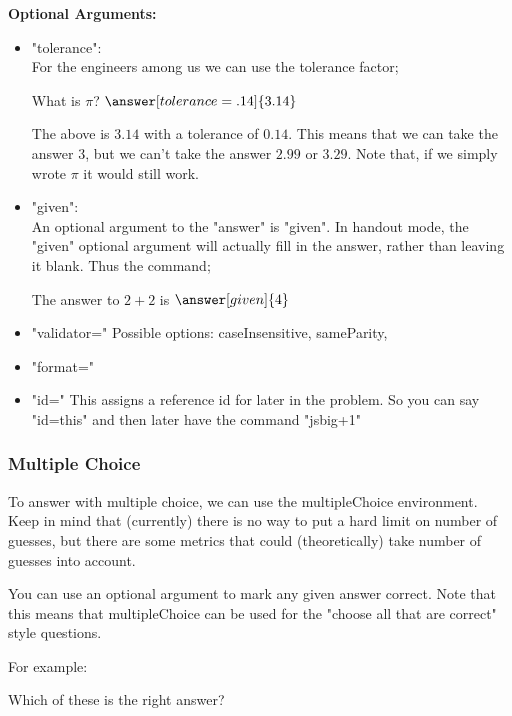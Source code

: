 \documentclass{ximera}
\begin{document}
\textbf{Optional Arguments:}

\begin{itemize}
\item "tolerance":\\
For the engineers among us we can use the tolerance factor;
\begin{problem}
What is $\pi$?
$\answer[tolerance=.14]{3.14}$
\end{problem}
The above is $3.14$ with a tolerance of $0.14$. This means that we can take the answer 3, but we can't take the answer $2.99$ or $3.29$. Note that, if we simply wrote $\pi$ it would still work.


\item "given":\\
An optional argument to the "answer" is "given". In handout mode, the "given" optional argument will actually fill in the answer, rather than leaving it blank. Thus the command;

\begin{question}
The answer to $2 + 2$ is $\answer[given]{4}$
\end{question}

\item "validator="
Possible options: caseInsensitive, sameParity, 

\item "format="

\item "id="
This assigns a reference id for later in the problem. So you can say "id=this" and then later have the command "js{big+1}"



\end{itemize}

\subsubsection{Multiple Choice}
To answer with multiple choice, we can use the multipleChoice environment. Keep in mind that (currently) there is no way to put a hard limit on number of guesses, but there are some metrics that could (theoretically) take number of guesses into account. 

You can use an optional argument to mark any given answer correct. Note that this means that multipleChoice can be used for the "choose all that are correct" style questions.

For example:
\begin{problem}
Which of these is the right answer?
\begin{multipleChoice}
\end{multipleChoice}
\end{problem}
\end{document}
